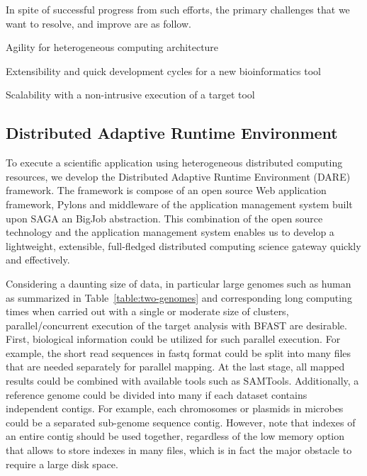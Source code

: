 \documentclass{acm_proc_article-sp}
\begin{document}
In spite of successful progress from such efforts, the primary
challenges that we want to resolve, and improve are as follow.
\begin{itemize*}
\item Agility for heterogeneous computing architecture
\item Extensibility and quick development cycles for a new bioinformatics tool
\item Scalability with a non-intrusive execution of a target tool  
\end{itemize*}

\subsection{Distributed Adaptive Runtime Environment}

To execute a scientific application using heterogeneous distributed
computing resources, we develop the Distributed Adaptive Runtime
Environment (DARE) framework\cite{dareurl}.  The framework is compose
of an open source Web application framework, Pylons and middleware of
the application management system built upon SAGA an BigJob
abstraction\cite{saga-ccgrid10,saga-royalsoc,saga-web,jha2009developing,ecmls10}.
This combination of the open source technology and the application
management system enables us to develop a lightweight, extensible,
full-fledged distributed computing science gateway quickly and
effectively\cite{pylonsurl}.

Considering a daunting size of data, in particular large genomes such as human as summarized in Table~\ref{table:two-genomes} and corresponding long computing times when carried out with a single or moderate size of clusters, parallel/concurrent execution of the target analysis with BFAST are desirable.  First, biological information could be utilized for such parallel execution. For example, the short read sequences in fastq format could be split into many files that are needed separately for parallel mapping.  At the last stage, all mapped results could be combined with available tools such as SAMTools\cite{samtools}.   Additionally, a reference genome could be divided into many if each dataset contains independent contigs.  For example, each chromosomes or plasmids in microbes could be a separated sub-genome sequence contig.  However, note that indexes of an entire contig should be used together, regardless of the low memory option that allows to store indexes in many files, which is in fact the major obstacle to require a large disk space.
\end{document}
